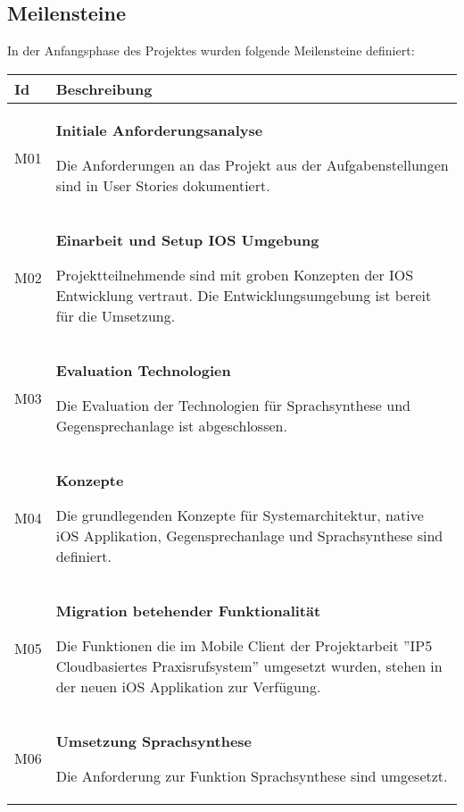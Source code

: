 \subsection{Meilensteine}

In der Anfangsphase des Projektes wurden folgende Meilensteine definiert:

\begin{table}[h]
    \centering
    \begin{tabular}{|l|p{15cm}|}
        \hline
        \textbf{Id} & \textbf{Beschreibung}                                                                                                                                                                                         \\
        \hline

        M01         & \textbf{Initiale Anforderungsanalyse}

        Die Anforderungen an das Projekt aus der Aufgabenstellungen sind in User Stories dokumentiert.\\
        \hline

        M02         & \textbf{Einarbeit und Setup IOS Umgebung}

        Projektteilnehmende sind mit groben Konzepten der IOS Entwicklung vertraut.
        Die Entwicklungsumgebung ist bereit für die Umsetzung. \\
        \hline

        M03         & \textbf{Evaluation Technologien}

        Die Evaluation der Technologien für Sprachsynthese und Gegensprechanlage ist abgeschlossen. \\
        \hline

        M04         & \textbf{Konzepte}

        Die grundlegenden Konzepte für Systemarchitektur, native iOS Applikation, Gegensprechanlage und Sprachsynthese sind definiert. \\
        \hline

        M05         & \textbf{Migration betehender Funktionalität}

        Die Funktionen die im Mobile Client der Projektarbeit ''IP5 Cloudbasiertes Praxisrufsystem'' umgesetzt wurden, stehen in der neuen iOS Applikation zur Verfügung. \\
        \hline

        M06         & \textbf{Umsetzung Sprachsynthese}

        Die Anforderung zur Funktion Sprachsynthese sind umgesetzt. \\
        \hline


\end{tabular}
\end{table}

